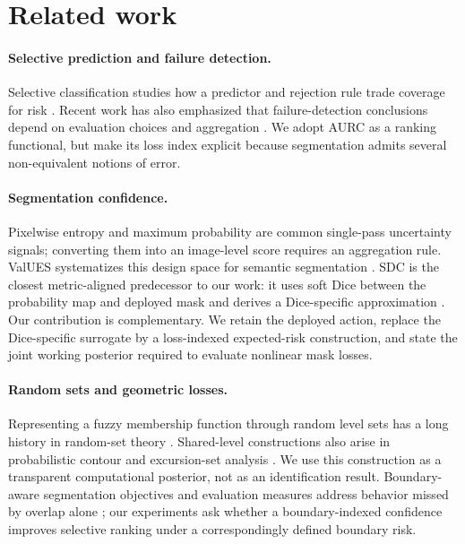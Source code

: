 \section{Related work}
\label{sec:related}

\paragraph{Selective prediction and failure detection.}
Selective classification studies how a predictor and rejection rule trade coverage
for risk \citep{geifman2017selective,selectivenet,feng}. Recent work has also
emphasized that failure-detection conclusions depend on evaluation choices and
aggregation \citep{jaeger,values}. We adopt AURC as a ranking functional, but make
its loss index explicit because segmentation admits several non-equivalent notions
of error.

\paragraph{Segmentation confidence.}
Pixelwise entropy and maximum probability are common single-pass uncertainty
signals; converting them into an image-level score requires an aggregation rule.
ValUES systematizes this design space for semantic segmentation \citep{values}.
SDC is the closest metric-aligned predecessor to our work: it uses soft Dice between
the probability map and deployed mask and derives a Dice-specific approximation
\citep{sdc}. Our contribution is complementary. We retain the deployed action,
replace the Dice-specific surrogate by a loss-indexed expected-risk construction,
and state the joint working posterior required to evaluate nonlinear mask losses.

\paragraph{Random sets and geometric losses.}
Representing a fuzzy membership function through random level sets has a long
history in random-set theory \citep{goodman,molchanov}. Shared-level constructions
also arise in probabilistic contour and excursion-set analysis
\citep{poethkow,bolin}. We use this construction as a transparent computational
posterior, not as an identification result. Boundary-aware segmentation objectives
and evaluation measures address behavior missed by overlap alone
\citep{karimi2020}; our experiments ask whether a boundary-indexed confidence
improves selective ranking under a correspondingly defined boundary risk.
